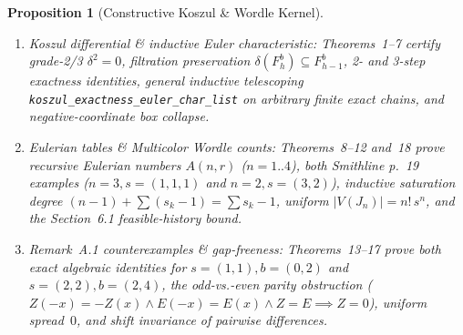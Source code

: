 \documentclass[11pt,twocolumn]{article}
\newtheorem{proposition}{Proposition}
\begin{document}
\begin{proposition}[Constructive Koszul \& Wordle Kernel]\label{prop:lean}
\leavevmode
\begin{enumerate}[leftmargin=*,nosep]
  \item \emph{Koszul differential \& inductive Euler characteristic:} Theorems~1--7 certify grade-2/3 $\delta^2 = 0$, filtration preservation $\delta(F_h^b) \subseteq F_{h-1}^b$, 2- and 3-step exactness identities, general inductive telescoping \texttt{koszul\_\allowbreak exactness\_\allowbreak euler\_\allowbreak char\_\allowbreak list} on arbitrary finite exact chains, and negative-coordinate box collapse.
  \item \emph{Eulerian tables \& Multicolor Wordle counts:} Theorems~8--12 and~18 prove recursive Eulerian numbers $A(n,r)$ ($n=1..4$), both Smithline p.~19 examples ($n=3, s=(1,1,1)$ and $n=2, s=(3,2)$), inductive saturation degree $(n-1)+\sum(s_k-1) = \sum s_k - 1$, uniform $|V(J_n)| = n!\,s^n$, and the Section~6.1 feasible-history bound.
  \item \emph{Remark~A.1 counterexamples \& gap-freeness:} Theorems~13--17 prove both exact algebraic identities for $s=(1,1), b=(0,2)$ and $s=(2,2), b=(2,4)$, the odd-vs.-even parity obstruction ($Z(-x)= -Z(x) \land E(-x)=E(x) \land Z=E \implies Z=0$), uniform spread~$0$, and shift invariance of pairwise differences.
\end{enumerate}
\end{proposition}
\end{document}
